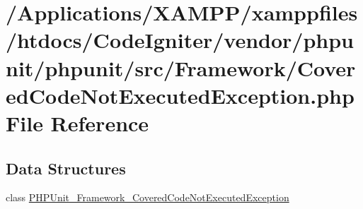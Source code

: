 \hypertarget{phpunit_2src_2_framework_2_covered_code_not_executed_exception_8php}{}\section{/\+Applications/\+X\+A\+M\+P\+P/xamppfiles/htdocs/\+Code\+Igniter/vendor/phpunit/phpunit/src/\+Framework/\+Covered\+Code\+Not\+Executed\+Exception.php File Reference}
\label{phpunit_2src_2_framework_2_covered_code_not_executed_exception_8php}
\subsection*{Data Structures}
\begin{DoxyCompactItemize}
\item 
class \mbox{\hyperlink{class_p_h_p_unit___framework___covered_code_not_executed_exception}{P\+H\+P\+Unit\+\_\+\+Framework\+\_\+\+Covered\+Code\+Not\+Executed\+Exception}}
\end{DoxyCompactItemize}
